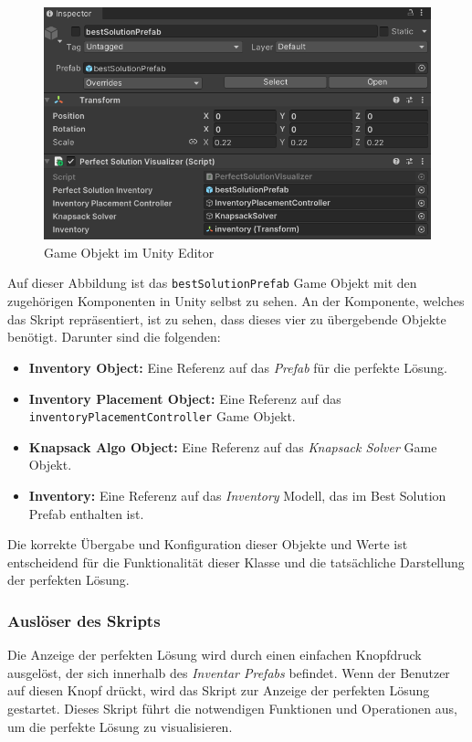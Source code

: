 \begin{figure}[H]
    \centering
    \includegraphics[scale=0.8]{images/bestSolPref_Editor}
    \caption{Game Objekt im Unity Editor}
    \label{fig:bestSol_Editor}
\end{figure}

Auf dieser Abbildung ist das \texttt{bestSolutionPrefab} Game Objekt mit den zugehörigen Komponenten in Unity selbst zu
sehen. An der Komponente, welches das Skript repräsentiert, ist zu sehen, dass dieses vier zu übergebende Objekte benötigt.
Darunter sind die folgenden:
\begin{itemize}
    \item \textbf{Inventory Object:} Eine Referenz auf das \textit{Prefab} für die perfekte Lösung.
    \item \textbf{Inventory Placement Object:} Eine Referenz auf das \texttt{inventoryPlacementController} Game Objekt.
    \item \textbf{Knapsack Algo Object:} Eine Referenz auf das \textit{Knapsack Solver} Game Objekt.
    \item \textbf{Inventory:} Eine Referenz auf das \textit{Inventory} Modell, das im Best Solution Prefab enthalten ist.
\end{itemize}

Die korrekte Übergabe und Konfiguration dieser Objekte und Werte ist entscheidend für die Funktionalität dieser Klasse
und die tatsächliche Darstellung der perfekten Lösung.

\subsubsection{Auslöser des Skripts}
Die Anzeige der perfekten Lösung wird durch einen einfachen Knopfdruck ausgelöst, der sich innerhalb des \textit{Inventar Prefabs}
befindet. Wenn der Benutzer auf diesen Knopf drückt, wird das Skript zur Anzeige der perfekten Lösung gestartet. Dieses
Skript führt die notwendigen Funktionen und Operationen aus, um die perfekte Lösung zu visualisieren.

